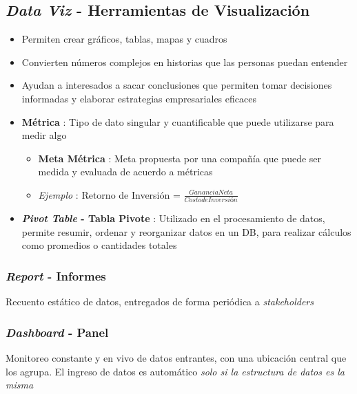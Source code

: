 \subsection{\textit{Data Viz} - Herramientas de Visualización}
\begin{itemize}
    \item {Permiten crear gráficos, tablas, mapas y cuadros}
    \item {Convierten números complejos en historias que las personas puedan entender}
    \item {Ayudan a interesados a sacar conclusiones que permiten tomar decisiones informadas y elaborar estrategias empresariales eficaces}
    \item {\textbf{Métrica} : Tipo de dato singular y cuantificable que puede utilizarse para medir algo
    \begin{itemize}
        \item {\textbf{Meta Métrica} : Meta propuesta por una compañía que puede ser medida y evaluada de acuerdo a métricas}
        \item {\textit{Ejemplo} : Retorno de Inversión = $\frac{Ganancia Neta}{Costo de Inversión}$}
    \end{itemize}}
    \item {\textbf{\textit{Pivot Table} - Tabla Pivote} : Utilizado en el procesamiento de datos, permite resumir, ordenar y reorganizar datos en un DB, para realizar cálculos como promedios o cantidades totales}
\end{itemize}

\subsubsection{\textit{Report} - Informes}
Recuento estático de datos, entregados de forma periódica a \textit{stakeholders}

\subsubsection{\textit{Dashboard} - Panel}
Monitoreo constante y en vivo de datos entrantes, con una ubicación central que los agrupa. El ingreso de datos es automático \textit{solo si la estructura de datos es la misma}
